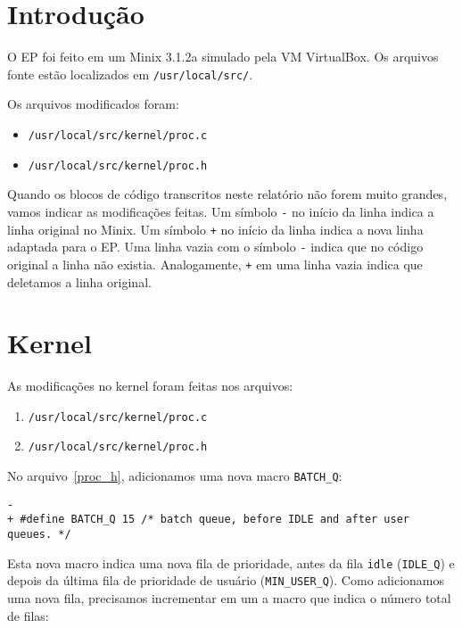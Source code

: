 \documentclass{amsart}
\title[]{\rule{10.5cm}{0.8pt}\\Exercício-Programa 2:\\
Escalonamento de Processos
\\\vspace{2mm}\footnotesize
  Sistemas Operacionais --- MAC0422\\\rule{10cm}{0.8pt}}
\author[]{Renato Lui Geh\\NUSP\@: 8536030\\
          Guilherme Freire\\NUSP\@: }
\theoremstyle{plain}
\newcommand{\code}[1]{\lstinline[mathescape=true]{#1}}
\begin{document}
\date{\today}
\maketitle

\section{Introdução}

O EP foi feito em um Minix 3.1.2a simulado pela VM VirtualBox. Os arquivos fonte estão localizados
em \code{/usr/local/src/}.

Os arquivos modificados foram:

\begin{itemize}
  \item \code{/usr/local/src/kernel/proc.c}
  \item \code{/usr/local/src/kernel/proc.h}
\end{itemize}

Quando os blocos de código transcritos neste relatório não forem muito grandes, vamos indicar as
modificações feitas. Um símbolo \code{-} no início da linha indica a linha original no Minix. Um
símbolo \code{+} no início da linha indica a nova linha adaptada para o EP\@. Uma linha vazia com o
símbolo \code{-} indica que no código original a linha não existia. Analogamente, \code{+} em uma
linha vazia indica que deletamos a linha original.

\section{Kernel}

As modificações no kernel foram feitas nos arquivos:

\begin{enumerate}
  \item\label{proc_c} \code{/usr/local/src/kernel/proc.c}
  \item\label{proc_h} \code{/usr/local/src/kernel/proc.h}
\end{enumerate}

No arquivo~\ref{proc_h}, adicionamos uma nova macro \code{BATCH_Q}:

\begin{lstlisting}[frame=leftline,mathescape=true,style=nonumbers]
-
+ #define BATCH_Q 15 /* batch queue, before IDLE and after user queues. */
\end{lstlisting}

Esta nova macro indica uma nova fila de prioridade, antes da fila \code{idle} (\code{IDLE_Q}) e
depois da última fila de prioridade de usuário (\code{MIN_USER_Q}). Como adicionamos uma nova fila,
precisamos incrementar em um a macro que indica o número total de filas:
\end{document}
